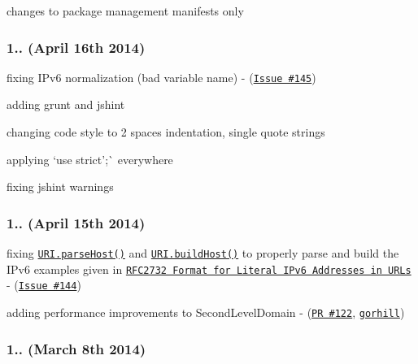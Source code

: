 \begin{DoxyItemize}
\item changes to package management manifests only
\end{DoxyItemize}

\subsubsection*{1.. (April 16th 2014)}


\begin{DoxyItemize}
\item fixing I\+Pv6 normalization (bad variable name) -\/ (\href{https://github.com/medialize/URI.js/issues/145}{\tt Issue \#145})
\item adding grunt and jshint
\item changing code style to 2 spaces indentation, single quote strings
\item applying `\textquotesingle{}use strict';\`{} everywhere
\item fixing jshint warnings
\end{DoxyItemize}

\subsubsection*{1.. (April 15th 2014)}


\begin{DoxyItemize}
\item fixing \href{http://medialize.github.io/URI.js/docs.html#static-parseHost}{\tt {\ttfamily U\+R\+I.\+parse\+Host()}} and \href{http://medialize.github.io/URI.js/docs.html#static-buildHost}{\tt {\ttfamily U\+R\+I.\+build\+Host()}} to properly parse and build the I\+Pv6 examples given in \href{http://tools.ietf.org/html/rfc2732#section-2}{\tt R\+F\+C2732 Format for Literal I\+Pv6 Addresses in U\+RL\textquotesingle{}s} -\/ (\href{https://github.com/medialize/URI.js/issues/144}{\tt Issue \#144})
\item adding performance improvements to Second\+Level\+Domain -\/ (\href{https://github.com/medialize/URI.js/pull/122}{\tt PR \#122}, \href{https://github.com/gorhill}{\tt gorhill})
\end{DoxyItemize}

\subsubsection*{1.. (March 8th 2014)}


